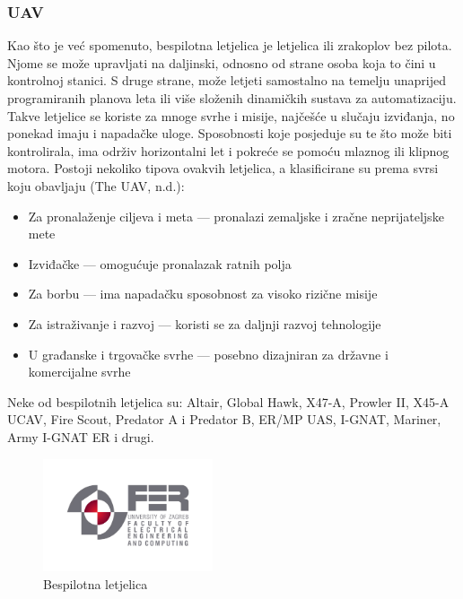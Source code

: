\documentclass[times, utf8, diplomski]{fer}
\begin{document}
\subsubsection{UAV}
Kao što je već spomenuto, bespilotna letjelica je letjelica ili zrakoplov bez pilota. Njome se može upravljati na daljinski, odnosno od strane osoba koja to čini u kontrolnoj stanici. S druge strane, može letjeti samostalno na temelju unaprijed programiranih planova leta ili više složenih dinamičkih sustava za automatizaciju. Takve letjelice se koriste za mnoge svrhe i misije, najčešće u slučaju izviđanja, no ponekad imaju i napadačke uloge. Sposobnosti koje posjeduje su te što može biti kontrolirala, ima održiv horizontalni let i pokreće se pomoću mlaznog ili klipnog motora. Postoji nekoliko tipova ovakvih letjelica, a klasificirane su prema svrsi koju obavljaju (The UAV, n.d.):
\begin{itemize}
\item Za pronalaženje ciljeva i meta --- pronalazi zemaljske i zračne neprijateljske mete 
\item Izviđačke --- omogućuje pronalazak ratnih polja
\item Za borbu --- ima napadačku sposobnost za visoko rizične misije
\item Za istraživanje i razvoj --- koristi se za daljnji razvoj tehnologije
\item U građanske i trgovačke svrhe --- posebno dizajniran za državne i komercijalne svrhe
\end{itemize}
Neke  od  bespilotnih  letjelica  su:  Altair,  Global  Hawk,  X47-A, Prowler II, X45-A UCAV, Fire Scout, Predator A i Predator B, ER/MP UAS, I-GNAT, Mariner, Army I-GNAT ER i drugi.
\begin{figure}[htb]
\centering
\includegraphics[width=5cm]{img/fer_logo.jpg}
\caption{Bespilotna letjelica\protect\footnotemark}
\label{fig:bespilotna letjelica}
\end{figure}
\end{document}
